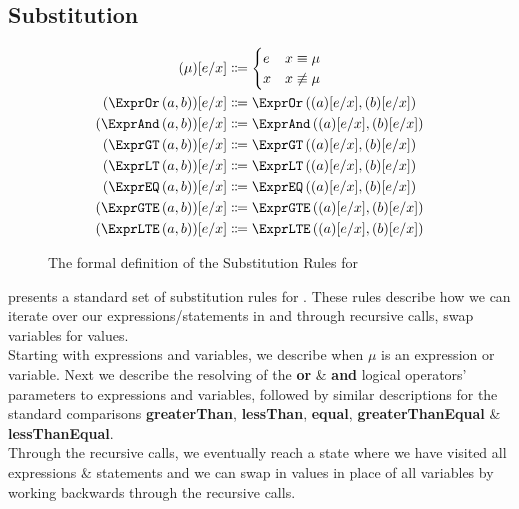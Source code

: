 \subsection{Substitution}
\label{subsec:substitution}

\begin{figure}[ht]
  \centering
\begin{align*}
  \subst{\mu}{e}{x}
  &
    \Coloneqq
    \begin{cases}
      e&x\equiv\mu\\
      x&x\not\equiv\mu\\
    \end{cases}
  \\
  \subst{\exprOr{a}{b}}{e}{x}&\Coloneqq\exprOr{\subst{a}{e}{x}}{\subst{b}{e}{x}}\\
  \subst{\exprAnd{a}{b}}{e}{x}&\Coloneqq\exprAnd{\subst{a}{e}{x}}{\subst{b}{e}{x}}\\
  \subst{\exprGT{a}{b}}{e}{x}&\Coloneqq\exprGT{\subst{a}{e}{x}}{\subst{b}{e}{x}}\\
  \subst{\exprLT{a}{b}}{e}{x}&\Coloneqq\exprLT{\subst{a}{e}{x}}{\subst{b}{e}{x}}\\
  \subst{\exprEQ{a}{b}}{e}{x}&\Coloneqq\exprEQ{\subst{a}{e}{x}}{\subst{b}{e}{x}}\\
  \subst{\exprGTE{a}{b}}{e}{x}&\Coloneqq\exprGTE{\subst{a}{e}{x}}{\subst{b}{e}{x}}\\
  \subst{\exprLTE{a}{b}}{e}{x}&\Coloneqq\exprLTE{\subst{a}{e}{x}}{\subst{b}{e}{x}}
\end{align*}
  \caption{\label{fig:subst}The formal definition of the Substitution Rules for \thePolicyLang}
\end{figure}

 presents a standard set of substitution rules for \thePolicyLang.
These rules describe how we can iterate over our expressions/statements in \thePolicyLang and through recursive calls, swap variables for values.\\
Starting with expressions and variables, we describe when $\mu$ is an expression or variable. Next we describe the resolving of the \textbf{or} \& \textbf{and} logical operators' parameters to expressions and variables, followed by similar descriptions for the standard comparisons \textbf{greaterThan}, \textbf{lessThan}, \textbf{equal}, \textbf{greaterThanEqual} \& \textbf{lessThanEqual}.\\
Through the recursive calls, we eventually reach a state where we have visited all expressions \& statements and we can swap in values in place of all variables by working backwards through the recursive calls.
